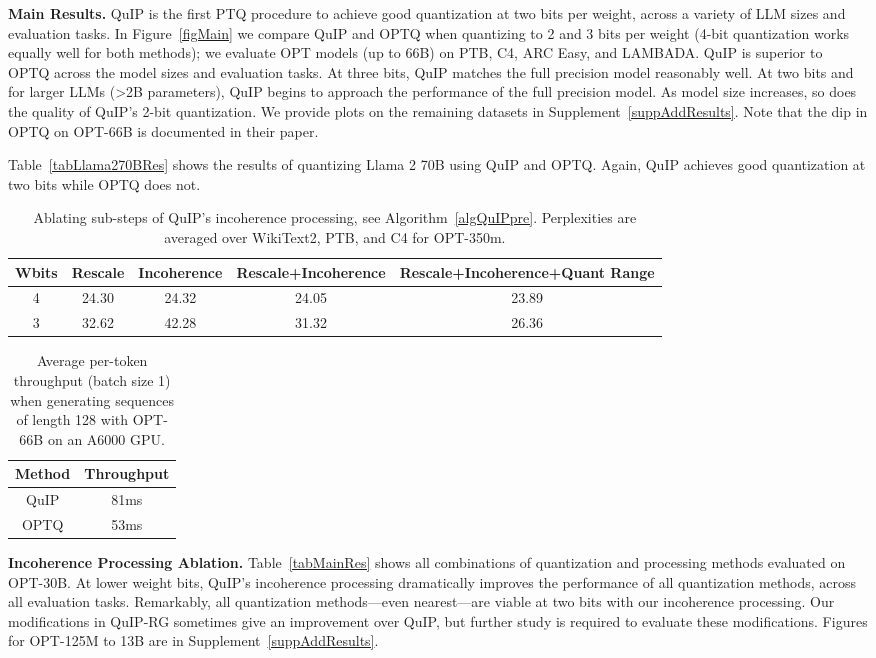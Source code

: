 \textbf{Main Results.}
QuIP is the first PTQ procedure to achieve good quantization at two bits per weight, across a variety of LLM sizes and evaluation tasks.
In Figure~\ref{figMain} we compare QuIP and OPTQ when quantizing to 2 and 3 bits per weight (4-bit quantization works equally well for both methods); we evaluate OPT models (up to 66B) on PTB, C4, ARC Easy, and LAMBADA.
QuIP is superior to OPTQ across the model sizes and evaluation tasks.
At three bits, QuIP matches the full precision model reasonably well.
At two bits and for larger LLMs (>2B parameters), QuIP begins to approach the performance of the full precision model.
As model size increases, so does the quality of QuIP's 2-bit quantization.
We provide plots on the remaining datasets in Supplement~\ref{suppAddResults}.
Note that the dip in OPTQ on OPT-66B is documented in their paper.

Table~\ref{tabLlama270BRes} shows the results of quantizing Llama 2 70B using QuIP and OPTQ. 
Again, QuIP achieves good quantization at two bits while OPTQ does not. 


\begin{table}[]
\centering
\begin{tabular}{c|cccc}
Wbits & Rescale & Incoherence & Rescale+Incoherence & Rescale+Incoherence+Quant Range \\
\hline
4\Tstrut & 
24.30 &
24.32 &
24.05 &
23.89 \\
3 &
32.62 &
42.28 &
31.32 &
26.36
\end{tabular}
\caption{
Ablating sub-steps of QuIP's incoherence processing, see Algorithm~\ref{algQuIPpre}.
Perplexities are averaged over WikiText2, PTB, and C4 for OPT-350m.
}
\label{tabAblateIP}
\end{table}



\begin{table}
\centering
\begin{tabular}{cc}
Method & Throughput  \\
\hline
QuIP\Tstrut & 81ms \\
OPTQ & 53ms \\
\end{tabular}
\caption{
Average per-token throughput (batch size 1) when generating sequences of length 128 with OPT-66B on an A6000 GPU.
}
\label{tabThroughput}
\end{table}


\textbf{Incoherence Processing Ablation.}
Table~\ref{tabMainRes} shows all combinations of quantization and processing methods evaluated on OPT-30B.
At lower weight bits, QuIP's incoherence processing dramatically improves the performance of all quantization methods, across all evaluation tasks.
Remarkably, all quantization methods---even nearest---are viable at two bits with our incoherence processing.
Our modifications in QuIP-RG sometimes give an improvement over QuIP, but further study is required to evaluate these modifications.
Figures for OPT-125M to 13B are in Supplement~\ref{suppAddResults}.

